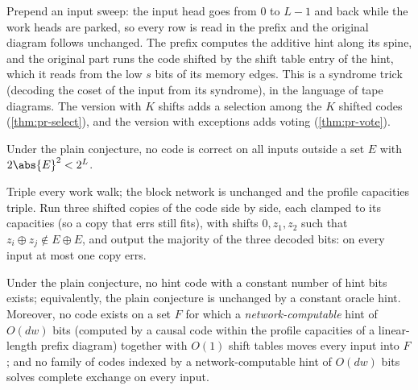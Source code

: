 \begin{outline}
Prepend an input sweep: the input head goes from $0$ to $L-1$ and back while the work heads are
parked, so every row is read in the prefix and the original diagram follows unchanged. The prefix
computes the additive hint along its spine, and the original part runs the code shifted by the shift
table entry of the hint, which it reads from the low $s$ bits of its memory edges. This is a syndrome trick (decoding the coset of the input from its syndrome), in the language of tape
diagrams. The version with
$K$ shifts adds a selection among the $K$ shifted codes (\cref{thm:pr-select}), and the version with
exceptions adds voting (\cref{thm:pr-vote}).
\end{outline}

\begin{theorem}\label{thm:pr-vote}
Under the plain conjecture, no code is correct on all inputs outside a set $E$ with
$2\abs{E}^2<2^L$.
\end{theorem}

\begin{outline}
Triple every work walk; the block network is unchanged and the profile capacities triple. Run three
shifted copies of the code side by side, each clamped to its capacities (so a copy that errs still fits),
with shifts $0,z_1,z_2$ such that $z_i\oplus z_j\notin E\oplus E$, and output the majority of the three
decoded bits: on every input at most one copy errs.
\end{outline}

\begin{theorem}\label{thm:pr-select}
Under the plain conjecture, no hint code with a constant number of hint bits exists; equivalently, the
plain conjecture is unchanged by a constant oracle hint. Moreover, no code exists on a set $F$
for which a \emph{network-computable} hint of $O(dw)$ bits (computed by a causal code within the profile capacities of
a linear-length prefix diagram) together with $O(1)$ shift tables moves every input into $F$; and no
family of codes indexed by a network-computable hint of $O(dw)$ bits solves complete exchange on every
input.
\end{theorem}

